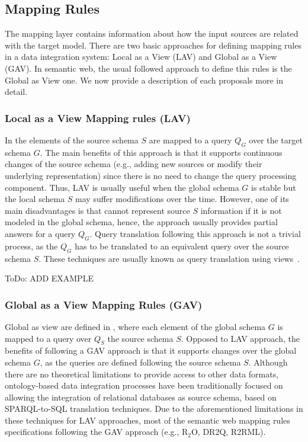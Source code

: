 \subsection{Mapping Rules}
The mapping layer contains information about how the input sources are related with the target model. There are two basic approaches for defining mapping rules in a data integration system: Local as a View (LAV) and Global as a View (GAV). In semantic web, the usual followed approach to define this rules is the Global as View one. We now provide a description of each proposals more in detail.

\subsubsection{Local as a View Mapping rules (LAV)}
In \citep{ullman1997information} the elements of the source schema $S$ are mapped  to a query $Q_G$ over the target schema $G$. The main benefits of this approach is that it supports continuous changes of the source schema (e.g., adding new sources or modify their underlying representation) since there is no need to change the query processing component. Thus, LAV is usually useful when the global schema $G$ is stable but the local schema $S$ may suffer modifications over the time. However, one of its main disadvantages is that cannot represent source $S$ information if it is not modeled in the global schema, hence, the approach usually provides partial answers for a query $Q_G$. Query translation following this approach is not a trivial process, as the $Q_G$ has to be translated to an equivalent query over the source schema $S$. These techniques are usually known as query translation using views~\citep{halevy2001answering}.

ToDo: ADD EXAMPLE

\subsubsection{Global as a View Mapping Rules (GAV)}
Global as view are defined in \citep{halevy2001answering}, where each element of the global schema $G$ is mapped to a query over $Q_S$ the source schema $S$. Opposed to LAV approach, the benefits of following a GAV approach is that it supports changes over the global schema $G$, as the queries are defined following the source schema $S$. Although there are no theoretical limitations to provide access to other data formats, ontology-based data integration processes have been traditionally focused on allowing the integration of relational databases as source schema, based on SPARQL-to-SQL translation techniques. Due to the aforementioned limitations in these techniques for LAV approaches, most of the semantic web mapping rules specifications following the GAV approach (e.g., R$_2$O, DR2Q, R2RML). 


